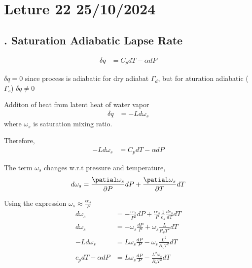 \documentclass[fleqn,10pt]{SelfArx} %
\begin{document}
\clearpage

\section{Leture 22 25/10/2024}
\subsection{. Saturation Adiabatic Lapse Rate }
\begin{align}
    \delta q &= C_p dT - \alpha dP
\end{align}

$\delta q =0$ since process is adiabatic for dry adiabat $\Gamma_d$, but for aturation adiabatic ($\Gamma_s$) $\delta q \neq 0$

Additon of heat from latent heat of water vapor 
\begin{align}
    \delta q &= -Ld\omega_s
\end{align}
where $\omega_s$ is saturation mixing ratio.

Therefore,
\begin{align}
    -Ld\omega_s &= C_pdT - \alpha dP
\end{align}

The term $\omega_s$ changes w.r.t pressure and temperature,
\begin{align}
    d\omega_s = \frac{\patial \omega_s}{\partial P} dP +  \frac{\patial \omega_s}{\partial T} dT
\end{align}

Using the expression $\omega_s \approx \frac{\epsilon e_s}{P}$
\begin{align}
    d\omega_s &= -\frac{\epsilon e_s}{P^2} dP + \frac{\epsilon e_s}{P} \frac{1}{e_s}\frac{de_s}{dT}dT \\
    d\omega_s &= -\omega_s \frac{dP}{P} + \omega_s \frac{L}{R_v T^2}dT \\
    -Ld\omega_s &= L\omega_s\frac{dP}{P} - \omega_s \frac{L^2}{R_v T^2}dT \\
    c_pdT - \alpha dP &= L\omega_s \frac{dP}{P} - \frac{L^2\omega_s}{R_vT^2}dT
\end{align}
\end{document}
